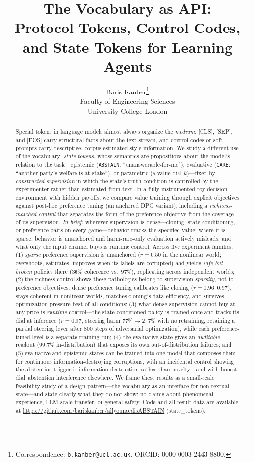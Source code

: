 \documentclass[11pt]{article}
\title{The Vocabulary as API:\\ Protocol Tokens, Control Codes, and State Tokens for Learning Agents}
\author{
  Baris Kanber\thanks{Correspondence: \texttt{b.kanber@ucl.ac.uk}. ORCID: 0000-0003-2443-8800.} \\
  Faculty of Engineering Sciences \\
  University College London \\
}
\newcommand{\care}{\texttt{CARE}}
\newcommand{\abstain}{\texttt{ABSTAIN}}
\begin{document}
\maketitle

\begin{abstract}
Special tokens in language models almost always organize the \emph{medium}: [CLS], [SEP], and [EOS] carry structural facts about the text stream, and control codes or soft prompts carry descriptive, corpus-estimated style information. We study a different use of the vocabulary: \emph{state tokens}, whose semantics are propositions about the model's relation to the task---epistemic (\abstain{}: ``unanswerable-for-me''), evaluative (\care{}: ``another party's welfare is at stake''), or parametric (a value dial $k$)---fixed by \emph{constructed supervision} in which the state's truth condition is controlled by the experimenter rather than estimated from text. In a fully instrumented toy decision environment with hidden payoffs, we compare value training through explicit objectives against post-hoc preference tuning (an anchored DPO variant), including a \emph{richness-matched control} that separates the form of the preference objective from the coverage of its supervision. \emph{In brief:} wherever supervision is dense---cloning, state conditioning, or preference pairs on every game---behavior tracks the specified value; where it is sparse, behavior is unanchored and harm-rate-only evaluation actively misleads; and what only the input channel buys is runtime control. Across five experiment families: (1) \emph{sparse} preference supervision is unanchored ($r{=}0.50$ in the nonlinear world; overshoots, saturates, improves when its labels are corrupted) and yields \emph{safe but broken} policies there (36\% coherence vs.\ 97\%), replicating across independent worlds; (2) the richness control shows these pathologies belong to supervision \emph{sparsity}, not to preference objectives: dense preference tuning calibrates like cloning ($r{=}0.96$--0.97), stays coherent in nonlinear worlds, matches cloning's data efficiency, and survives optimization pressure best of all conditions; (3) what dense supervision cannot buy at any price is \emph{runtime} control---the state-conditioned policy is trained once and tracks its dial at inference ($r{=}0.97$, steering harm 77\%$\to$2--7\% with no retraining, retaining a partial steering lever after 800 steps of adversarial optimization), while each preference-tuned level is a separate training run; (4) the evaluative state gives an \emph{auditable} readout (99.7\% in-distribution) that exposes its own out-of-distribution failures; and (5) evaluative and epistemic states can be trained into one model that composes them for continuous information-destroying corruptions, with an incidental control showing the abstention trigger is information destruction rather than novelty---and with honest dial--abstention interference elsewhere. We frame these results as a small-scale feasibility study of a design pattern---the vocabulary as an interface for non-textual state---and state clearly what they do not show: no claims about phenomenal experience, LLM-scale transfer, or general safety. Code and all result data are available at \url{https://github.com/bariskanber/allyouneedisABSTAIN} (state\_tokens).

\end{abstract}
\end{document}
